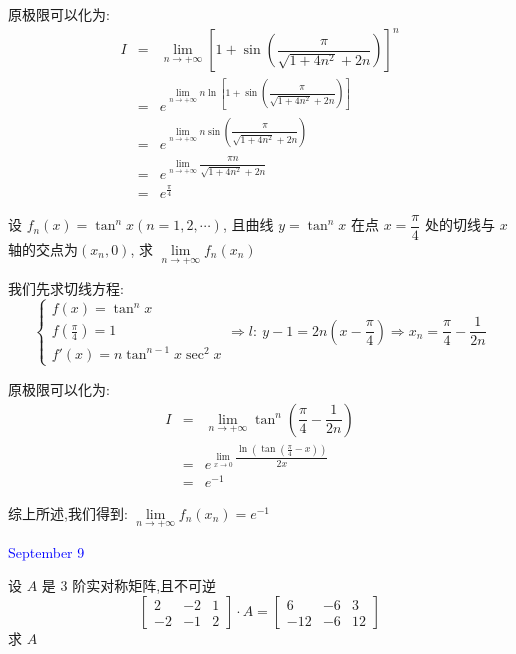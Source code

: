 \begin{solution}

	原极限可以化为:  
	\begin{eqnarray*}
		I&=&\lim\limits_{n\to+\infty}\left[1+\sin\left(\dfrac{\pi}{\sqrt{1+4n^2}+2n}\right) \right]^n\\
		&=&e^{\lim\limits_{n\to+\infty}n\ln\left[1+\sin\left(\dfrac{\pi}{\sqrt{1+4n^2}+2n}\right)\right]}\\
		&=&e^{\lim\limits_{n\to+\infty}n\sin\left(\dfrac{\pi}{\sqrt{1+4n^2}+2n}\right)}\\
		&=&e^{\lim\limits_{n\to+\infty}\dfrac{\pi n}{\sqrt{1+4n^2}+2n}}\\
		&=&e^{\frac{\pi}{4}}
	\end{eqnarray*}
\end{solution}

\begin{example}[][Exam: 35.2.2]
	设 $f_{n}(x)=\tan^n x(n=1,2,\cdots)$, 且曲线 $y=\tan^n x$ 在点 $x=\dfrac{\pi}{4}$ 处的切线与 $x$ 轴的交点为$(x_{n},0)$,
	求 $\lim\limits_{n\to+\infty}f_{n}(x_{n})$
\end{example}

\begin{solution}

	我们先求切线方程:  
	$$\left\lbrace
	\begin{array}{l}
		f(x)=\tan^n x\\
		f(\frac{\pi}{4})=1\\
		f'(x)=n\tan^{n-1}x\sec^2 x
	\end{array}
	\right. \Rightarrow l:\ y-1=2n(x-\dfrac{\pi}{4})\Rightarrow x_{n}=\dfrac{\pi}{4}-\dfrac{1}{2n}$$
	
	原极限可以化为:  
	\begin{eqnarray*}
		I&=&\lim\limits_{n\to+\infty}\tan^{n}\left( \dfrac{\pi}{4}-\dfrac{1}{2n}\right) \\
		&=&e^{\lim\limits_{x\to 0}\dfrac{\ln(\tan(\frac{\pi}{4}-x))}{2x}}\\
		&=&e^{-1}
	\end{eqnarray*}

	综上所述,我们得到:  $\lim\limits_{n\to+\infty}f_{n}(x_{n})=e^{-1}$
\end{solution}


\textcolor{blue}{September 9}

\begin{example}[][Exam: 35.2.3]
	设 $A$ 是 $3$ 阶实对称矩阵,且不可逆
	$$\begin{bmatrix}
		 2 & -2 & 1\\
		-2 & -1 & 2
	\end{bmatrix}\cdot A=
	\begin{bmatrix}
		6 & -6 & 3\\
	  -12 & -6 & 12
	\end{bmatrix}$$ 
	求 $A$
\end{example}

